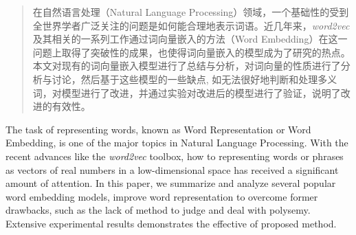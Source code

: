 ﻿\begin{abstract}

在自然语言处理（Natural Language Processing）领域，一个基础性的受到全世界学者广泛关注的问题是如何能合理地表示词语。近几年来，\emph{word2vec}及其相关的一系列工作通过词向量嵌入的方法（Word Embedding）在这一问题上取得了突破性的成果，也使得词向量嵌入的模型成为了研究的热点。本文对现有的词向量嵌入模型进行了总结与分析，对词向量的性质进行了分析与讨论，然后基于这些模型的一些缺点, 如无法很好地判断和处理多义词，对模型进行了改进，并通过实验对改进后的模型进行了验证，说明了改进的有效性。

\end{abstract}

\begin{enabstract}

The task of representing words, known as Word Representation or Word Embedding, is one of the major topics in Natural Language Processing. With the recent advances like the \emph{word2vec} toolbox, how to representing words or phrases as vectors of real numbers in a low-dimensional space has received a significant amount of attention. In this paper, we summarize and analyze several popular word embedding models, improve word representation to overcome former drawbacks, such as the lack of method to judge and deal with polysemy. Extensive experimental results demonstrates the effective of proposed method.

\end{enabstract}
